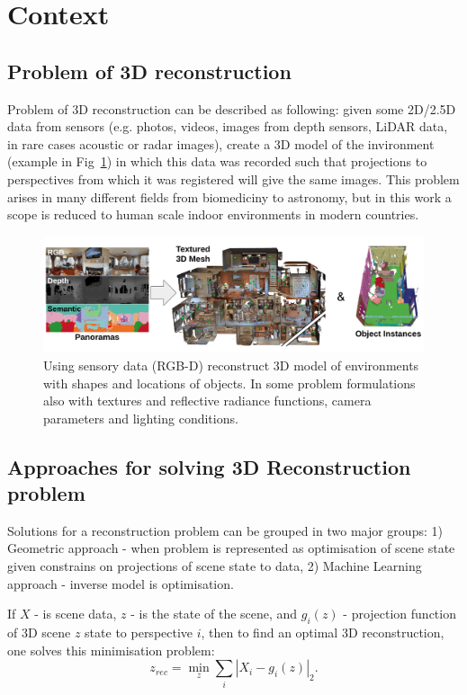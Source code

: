 \section{Context}
\subsection{Problem of 3D reconstruction}

Problem of 3D reconstruction can be described as following: given some 2D/2.5D data from sensors (e.g. photos, videos, images from depth sensors, LiDAR data, in rare cases acoustic or radar images), create a 3D model of the invironment (example in Fig~\ref{fig:reconstruction_steps}) in which this data was recorded such that projections to perspectives from which it was registered will give the same images. This problem arises in many different fields from biomediciny to astronomy, but in this work a scope is reduced to human scale indoor environments in modern countries.

\begin{figure}
	\centering
    \includegraphics[width=\textwidth]{Figures/reconstruction_steps.png}
    \caption{Using sensory data (RGB-D) reconstruct 3D model of environments with shapes and locations of objects. In some problem formulations also with textures and reflective radiance functions, camera parameters and lighting conditions.}
    \label{fig:reconstruction_steps}
\end{figure}


\subsection{Approaches for solving 3D Reconstruction problem}

Solutions for a reconstruction problem can be grouped in two major groups: 1) Geometric approach - when problem is represented as optimisation of scene state given constrains on projections of scene state to data, 2) Machine Learning approach - inverse model is optimisation.

If $X$ - is scene data, $z$ - is the state of the scene, and $g_i(z)$ - projection function of 3D scene $z$ state to perspective $i$, then to find an optimal 3D reconstruction, one solves this minimisation problem:
\begin{equation}
z_{rec} = \min_z\sum_i|X_i-g_i(z)|_2 .
\end{equation}

